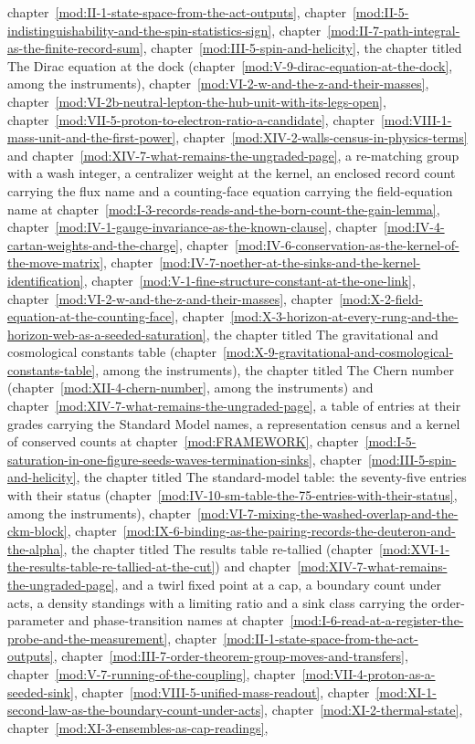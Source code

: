 \begin{chbridge}
chapter~\ref{mod:II-1-state-space-from-the-act-outputs}, chapter~\ref{mod:II-5-indistinguishability-and-the-spin-statistics-sign}, chapter~\ref{mod:II-7-path-integral-as-the-finite-record-sum}, chapter~\ref{mod:III-5-spin-and-helicity}, the chapter titled The Dirac equation at the dock (chapter~\ref{mod:V-9-dirac-equation-at-the-dock}, among the instruments), chapter~\ref{mod:VI-2-w-and-the-z-and-their-masses}, chapter~\ref{mod:VI-2b-neutral-lepton-the-hub-unit-with-its-legs-open}, chapter~\ref{mod:VII-5-proton-to-electron-ratio-a-candidate}, chapter~\ref{mod:VIII-1-mass-unit-and-the-first-power}, chapter~\ref{mod:XIV-2-walls-census-in-physics-terms} and chapter~\ref{mod:XIV-7-what-remains-the-ungraded-page}, a re-matching group with a wash integer, a centralizer weight at the kernel, an enclosed record count carrying the flux name and a counting-face equation carrying the field-equation name at chapter~\ref{mod:I-3-records-reads-and-the-born-count-the-gain-lemma}, chapter~\ref{mod:IV-1-gauge-invariance-as-the-known-clause}, chapter~\ref{mod:IV-4-cartan-weights-and-the-charge}, chapter~\ref{mod:IV-6-conservation-as-the-kernel-of-the-move-matrix}, chapter~\ref{mod:IV-7-noether-at-the-sinks-and-the-kernel-identification}, chapter~\ref{mod:V-1-fine-structure-constant-at-the-one-link}, chapter~\ref{mod:VI-2-w-and-the-z-and-their-masses}, chapter~\ref{mod:X-2-field-equation-at-the-counting-face}, chapter~\ref{mod:X-3-horizon-at-every-rung-and-the-horizon-web-as-a-seeded-saturation}, the chapter titled The gravitational and cosmological constants table (chapter~\ref{mod:X-9-gravitational-and-cosmological-constants-table}, among the instruments), the chapter titled The Chern number (chapter~\ref{mod:XII-4-chern-number}, among the instruments) and chapter~\ref{mod:XIV-7-what-remains-the-ungraded-page}, a table of entries at their grades carrying the Standard Model names, a representation census and a kernel of conserved counts at chapter~\ref{mod:FRAMEWORK}, chapter~\ref{mod:I-5-saturation-in-one-figure-seeds-waves-termination-sinks}, chapter~\ref{mod:III-5-spin-and-helicity}, the chapter titled The standard-model table: the seventy-five entries with their status (chapter~\ref{mod:IV-10-sm-table-the-75-entries-with-their-status}, among the instruments), chapter~\ref{mod:VI-7-mixing-the-washed-overlap-and-the-ckm-block}, chapter~\ref{mod:IX-6-binding-as-the-pairing-records-the-deuteron-and-the-alpha}, the chapter titled The results table re-tallied (chapter~\ref{mod:XVI-1-the-results-table-re-tallied-at-the-cut}) and chapter~\ref{mod:XIV-7-what-remains-the-ungraded-page}, and a twirl fixed point at a cap, a boundary count under acts, a density standings with a limiting ratio and a sink class carrying the order-parameter and phase-transition names at chapter~\ref{mod:I-6-read-at-a-register-the-probe-and-the-measurement}, chapter~\ref{mod:II-1-state-space-from-the-act-outputs}, chapter~\ref{mod:III-7-order-theorem-group-moves-and-transfers}, chapter~\ref{mod:V-7-running-of-the-coupling}, chapter~\ref{mod:VII-4-proton-as-a-seeded-sink}, chapter~\ref{mod:VIII-5-unified-mass-readout}, chapter~\ref{mod:XI-1-second-law-as-the-boundary-count-under-acts}, chapter~\ref{mod:XI-2-thermal-state}, chapter~\ref{mod:XI-3-ensembles-as-cap-readings}, 
\end{chbridge}
